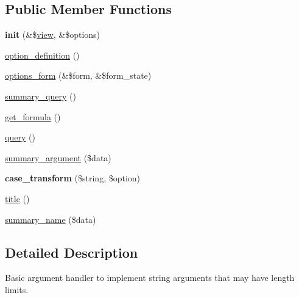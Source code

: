 \subsection*{Public Member Functions}
\begin{CompactItemize}
\item 
\hypertarget{classviews__handler__argument__string_504dc70451721c2b9ccae44240d13e2e}{
\textbf{init} (\&\$\hyperlink{classview}{view}, \&\$options)}
\label{classviews__handler__argument__string_504dc70451721c2b9ccae44240d13e2e}

\item 
\hyperlink{classviews__handler__argument__string_f27f79196cc9e29b2bbc635a896510e1}{option\_\-definition} ()
\item 
\hyperlink{classviews__handler__argument__string_b96e2120f4f4458921f817b343d11ef0}{options\_\-form} (\&\$form, \&\$form\_\-state)
\item 
\hyperlink{classviews__handler__argument__string_829ad5356d65f02a75af5d1e8374292b}{summary\_\-query} ()
\item 
\hyperlink{classviews__handler__argument__string_8c039cb85ad264fd03ff5cdef379dfb5}{get\_\-formula} ()
\item 
\hyperlink{classviews__handler__argument__string_d50bba6781755cfcd29b2a493dd838ec}{query} ()
\item 
\hyperlink{classviews__handler__argument__string_185c0d31b97f98df85073d53b3f8c26d}{summary\_\-argument} (\$data)
\item 
\hypertarget{classviews__handler__argument__string_b69150dccabab04aa8e63249438b8656}{
\textbf{case\_\-transform} (\$string, \$option)}
\label{classviews__handler__argument__string_b69150dccabab04aa8e63249438b8656}

\item 
\hyperlink{classviews__handler__argument__string_bd176c527d765826b51c50346309b545}{title} ()
\item 
\hyperlink{classviews__handler__argument__string_8cc60c274ca743c78de23260edc3ee4a}{summary\_\-name} (\$data)
\end{CompactItemize}


\subsection{Detailed Description}
Basic argument handler to implement string arguments that may have length limits. 

